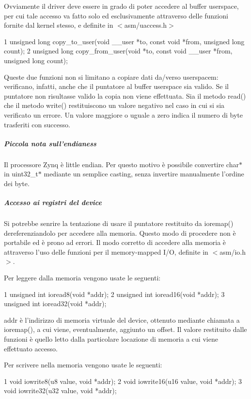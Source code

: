 Ovviamente il driver deve essere in grado di poter accedere al buffer userspace, per cui tale accesso va fatto solo ed esclusivamente attraverso delle funzioni fornite dal kernel stesso, e definite in $<$asm/uaccess.\+h$>$ 
\begin{DoxyCode}
1 unsigned long copy\_to\_user(void \_\_user *to, const void *from, unsigned long count);
2 unsigned long copy\_from\_user(void *to, const void \_\_user *from, unsigned long count);
\end{DoxyCode}
 Queste due funzioni non si limitano a copiare dati da/verso userspacem\+: verificano, infatti, anche che il puntatore al buffer userspace sia valido. Se il puntatore non risultasse valido la copia non viene effettuata. Sia il metodo read() che il metodo write() restituiscono un valore negativo nel caso in cui si sia verificato un errore. Un valore maggiore o uguale a zero indica il numero di byte trasferiti con successo.

\subparagraph*{Piccola nota sull'endianess}

Il processore Zynq è little endian. Per questo motivo è possibile convertire char$\ast$ in uint32\+\_\+t$\ast$ mediante un semplice casting, senza invertire manualmente l'ordine dei byte.

\subparagraph*{Accesso ai registri del device}

Si potrebbe senrire la tentazione di usare il puntatore restituito da ioremap() dereferenziandolo per accedere alla memoria. Questo modo di procedere non è portabile ed è prono ad errori. Il modo corretto di accedere alla memoria è attraverso l'uso delle funzioni per il memory-\/mapped I/\+O, definite in $<$asm/io.\+h$>$.

Per leggere dalla memoria vengono usate le seguenti\+:


\begin{DoxyCode}
1 unsigned int ioread8(void *addr);
2 unsigned int ioread16(void *addr);
3 unsigned int ioread32(void *addr);
\end{DoxyCode}


addr è l'indirizzo di memoria virtuale del device, ottenuto mediante chiamata a ioremap(), a cui viene, eventualmente, aggiunto un offset. Il valore restituito dalle funzioni è quello letto dalla particolare locazione di memoria a cui viene effettuato accesso.

Per scrivere nella memoria vengono usate le seguenti\+:


\begin{DoxyCode}
1 void iowrite8(u8 value, void *addr);
2 void iowrite16(u16 value, void *addr);
3 void iowrite32(u32 value, void *addr);
\end{DoxyCode}


